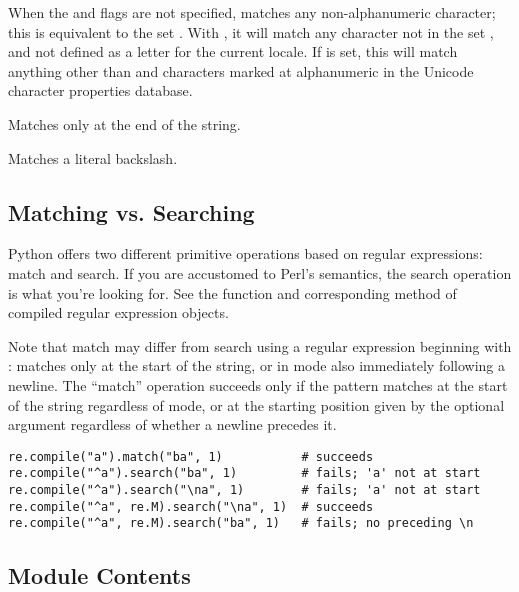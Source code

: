 \begin{list}{}{\leftmargin 0.7in }
\item[\code{\e W}]When the  and 
flags are not specified, matches any non-alphanumeric character; this
is equivalent to the set \regexp{[{\^}a-zA-Z0-9_]}.   With
, it will match any character not in the set
\regexp{[0-9_]}, and not defined as a letter for the current locale.
If  is set, this will match anything other than
\regexp{[0-9_]} and characters marked at alphanumeric in the Unicode
character properties database.

\item[\code{\e Z}]Matches only at the end of the string.

\item[\code{\e \e}] Matches a literal backslash.

\end{list}


\subsection{Matching vs. Searching \label{matching-searching}}

Python offers two different primitive operations based on regular
expressions: match and search.  If you are accustomed to Perl's
semantics, the search operation is what you're looking for.  See the
 function and corresponding method of compiled
regular expression objects.

Note that match may differ from search using a regular expression
beginning with \character{\^}: \character{\^} matches only at the
start of the string, or in  mode also immediately
following a newline.  The ``match'' operation succeeds only if the
pattern matches at the start of the string regardless of mode, or at
the starting position given by the optional  argument
regardless of whether a newline precedes it.

\begin{verbatim}
re.compile("a").match("ba", 1)           # succeeds
re.compile("^a").search("ba", 1)         # fails; 'a' not at start
re.compile("^a").search("\na", 1)        # fails; 'a' not at start
re.compile("^a", re.M).search("\na", 1)  # succeeds
re.compile("^a", re.M).search("ba", 1)   # fails; no preceding \n
\end{verbatim}


\subsection{Module Contents}

